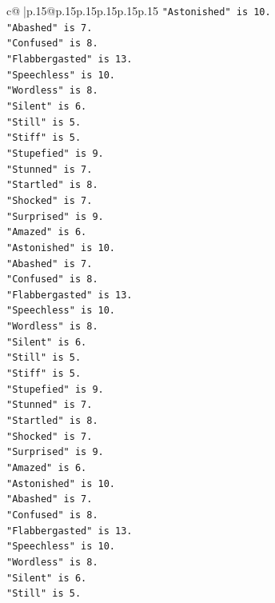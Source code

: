 \documentclass{article}
\begin{document}
{\begin{supertabular}{c@{$\;$}|p{.15\linewidth}@{}p{.15\linewidth}p{.15\linewidth}p{.15\linewidth}p{.15\linewidth}p{.15\linewidth}}
{{{\texttt{"Astonished" is 10.} \\
\texttt{"Abashed" is 7.} \\
\texttt{"Confused" is 8.} \\
\texttt{"Flabbergasted" is 13.} \\
\texttt{"Speechless" is 10.} \\
\texttt{"Wordless" is 8.} \\
\texttt{"Silent" is 6.} \\
\texttt{"Still" is 5.} \\
\texttt{"Stiff" is 5.} \\
\texttt{"Stupefied" is 9.} \\
\texttt{"Stunned" is 7.} \\
\texttt{"Startled" is 8.} \\
\texttt{"Shocked" is 7.} \\
\texttt{"Surprised" is 9.} \\
\texttt{"Amazed" is 6.} \\
\texttt{"Astonished" is 10.} \\
\texttt{"Abashed" is 7.} \\
\texttt{"Confused" is 8.} \\
\texttt{"Flabbergasted" is 13.} \\
\texttt{"Speechless" is 10.} \\
\texttt{"Wordless" is 8.} \\
\texttt{"Silent" is 6.} \\
\texttt{"Still" is 5.} \\
\texttt{"Stiff" is 5.} \\
\texttt{"Stupefied" is 9.} \\
\texttt{"Stunned" is 7.} \\
\texttt{"Startled" is 8.} \\
\texttt{"Shocked" is 7.} \\
\texttt{"Surprised" is 9.} \\
\texttt{"Amazed" is 6.} \\
\texttt{"Astonished" is 10.} \\
\texttt{"Abashed" is 7.} \\
\texttt{"Confused" is 8.} \\
\texttt{"Flabbergasted" is 13.} \\
\texttt{"Speechless" is 10.} \\
\texttt{"Wordless" is 8.} \\
\texttt{"Silent" is 6.} \\
\texttt{"Still" is 5.} \\
}}}
\end{supertabular}}
\end{document}
